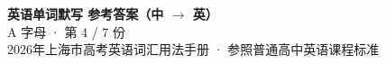 \documentclass[10pt,a4paper]{article}
\begin{document}
\pagestyle{plain}

\begin{center}
{\LARGE\bfseries 英语单词默写 \quad 参考答案（中 $\to$ 英）}\\[0.22em]
{\large A 字母 · 第 4 / 7 份}\\[0.18em]
{\small 2026年上海市高考英语词汇用法手册 · 参照普通高中英语课程标准}
\end{center}

\vspace{0.2em}
\noindent{\color{rulegray}\rule{\textwidth}{0.8pt}}

\vspace{0.35em}

\vspace{0.25em}
\renewcommand{\arraystretch}{1.32}
\end{document}
